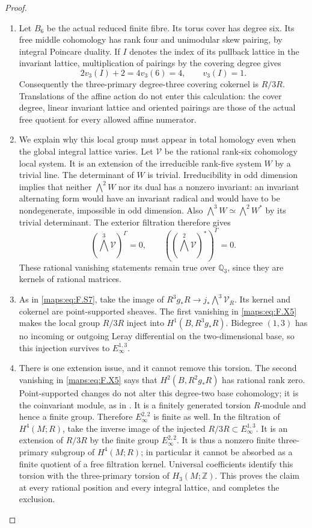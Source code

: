 \begin{proof}
\begin{enumerate}[label=\arabic*.]
\item Let $B_6$ be the actual reduced finite fibre.  Its torus
cover has degree six.  Its free middle cohomology has
rank four and unimodular skew pairing, by integral
Poincare duality.  If $I$ denotes the index of its
pullback lattice in the invariant lattice, multiplication
of pairings by the covering degree gives
\[
 2v_3(I)+2=4v_3(6)=4,
 \qquad v_3(I)=1.
 \tag{F.X4}\label{maps:eq:F.X4}
\]
Consequently the three-primary degree-three covering
cokernel is $R/3R$.  Translations of the affine action
do not enter this calculation: the cover degree,
linear invariant lattice and oriented pairings are
those of the actual free quotient for every allowed
affine numerator.

\item We explain why this local group must appear in total
homology even when the global integral lattice varies.
Let $\mathcal V$ be the rational rank-six cohomology
local system.  It is an extension of the irreducible
rank-five system $W$ by a trivial line.  The determinant
of $W$ is trivial.  Irreducibility in odd dimension
implies that neither $\bigwedge^2 W$ nor its dual
has a nonzero invariant: an invariant alternating
form would have an invariant radical and would have
to be nondegenerate, impossible in odd dimension.
Also $\bigwedge^3W\simeq\bigwedge^2W^*$ by its
trivial determinant.  The exterior filtration therefore
gives
\[
 (\bigwedge^3\mathcal V)^\Gamma=0,\qquad
 ((\bigwedge^2\mathcal V)^*)^\Gamma=0.
 \tag{F.X5}\label{maps:eq:F.X5}
\]
These rational vanishing statements remain true over
$\mathbb Q_3$, since they are kernels of rational
matrices.

\item As in \eqref{maps:eq:F.S7}, take the image of
$R^3g_*R\to j_*\bigwedge^3\mathcal V_R$.
Its kernel and cokernel are point-supported sheaves.
The first vanishing in \eqref{maps:eq:F.X5} makes the local group
$R/3R$ inject into $H^1(B,R^3g_*R)$.  Bidegree $(1,3)$
has no incoming or outgoing Leray differential on
the two-dimensional base, so this injection survives
to $E_\infty^{1,3}$.

\item There is one extension issue, and it cannot remove
this torsion.  The second vanishing in \eqref{maps:eq:F.X5} says
that $H^2(B,R^2g_*R)$ has rational rank zero.
Point-supported changes do not alter this degree-two
base cohomology; it is the coinvariant module, as
in .  It is a finitely generated torsion $R$-module
and hence a finite group.  Therefore
$E_\infty^{2,2}$ is finite as well.  In the filtration
of $H^4(M;R)$, take the inverse image of the injected
$R/3R\subset E_\infty^{1,3}$.  It is an extension
of $R/3R$ by the finite group $E_\infty^{2,2}$.
It is thus a nonzero finite three-primary subgroup
of $H^4(M;R)$; in particular it cannot be absorbed
as a finite quotient of a free filtration kernel.
Universal coefficients identify this torsion with
the three-primary torsion of $H_3(M;\mathbb Z)$.
This proves the claim at every rational position and
every integral lattice, and completes the exclusion.


\end{enumerate}
\end{proof}
